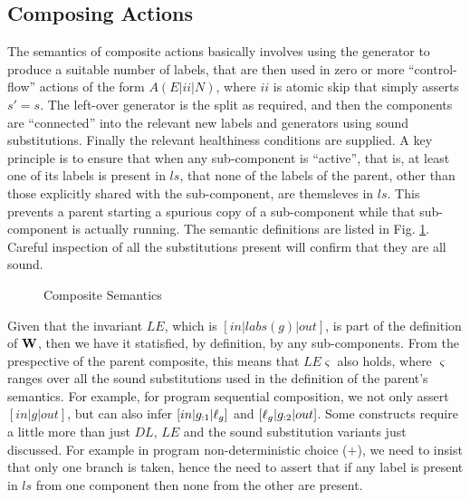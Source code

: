 \subsection{Composing Actions}\label{ssec:composing}

The semantics of composite actions basically involves using the generator
to produce a suitable number of labels,
that are then used in zero or more ``control-flow'' actions
of the form $A(E|ii|N)$, where $ii$ is atomic skip that simply asserts $s'=s$.
The left-over generator is the split as required,
and then the components are ``connected'' into
the relevant new labels and generators using sound substitutions.
Finally the relevant healthiness conditions are supplied.
A key principle is to ensure that when any sub-component is ``active'',
that is, at least one of its labels is present in $ls$,
that none of the labels of the parent,
other than those explicitly shared with the sub-component,
are themsleves in $ls$.
This prevents a parent starting a spurious copy of a sub-component
while that sub-component is actually running.
The semantic definitions are listed in Fig. \ref{fig:composite-semantics}.
Careful inspection of all the substitutions present will confirm that they
are all sound.
\begin{figure}
  \caption{Composite Semantics}
\label{fig:composite-semantics}
\end{figure}
Given that the invariant $LE$, which is $[in|labs(g)|out]$,
is part of the definition of $\mathbf{W}$,
then we have it statisfied, by definition, by any sub-components.
From the prespective of the parent composite, this means that $LE\varsigma$
also holds, where $\varsigma$ ranges over all the sound substitutions
used in the definition of the parent's semantics.
For example, for program sequential composition,
we not only assert $[in|g|out]$,
but can also infer $[in|g_{:1}|\ell_g]$
and $[\ell_g|g_{:2}|out]$.
Some constructs require a little more than just $DL$, $LE$ and the sound substitution
variants just discussed.
For example in program non-deterministic choice ($+$),
we need to insist that only one branch is taken, hence
the need to assert that if any label is present in $ls$ from one component
then none from the other are present.

